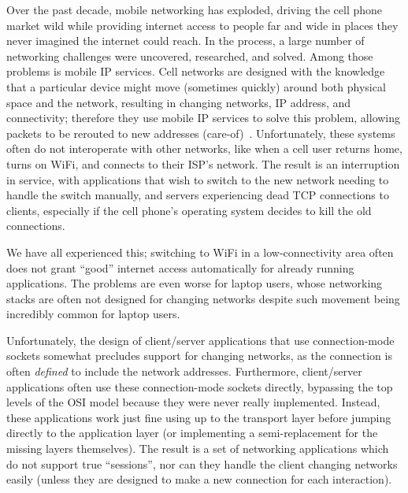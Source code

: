 \documentclass[twocolumn,11pt]{article}
\begin{document}
Over the past decade, mobile networking has exploded, driving the cell phone
market wild while providing internet access to people far and wide in places
they never imagined the internet could reach. In the process, a large number of
networking challenges were uncovered, researched, and solved. Among those
problems is mobile IP services. Cell networks are designed with the knowledge
that a particular device might move (sometimes quickly) around both physical
space and the network, resulting in changing networks, IP address, and
connectivity; therefore they use mobile IP services to solve this problem,
allowing packets to be rerouted to new addresses (care-of)~\cite{Kurose,mobileip}.
Unfortunately, these systems often do not interoperate
with other networks, like when a cell user returns home, turns on WiFi, and
connects to their ISP's network. The result is an
interruption in service, with applications that wish to switch to the new
network needing to handle the switch manually, and servers experiencing dead TCP
connections to clients, especially if the cell phone's operating system decides
to kill the old connections.

We have all experienced this; switching to WiFi in a low-connectivity area often
does not grant ``good'' internet access automatically for already running
applications. The problems are even worse for laptop users, whose networking
stacks are often not designed for changing networks despite such movement being
incredibly common for laptop users.

Unfortunately, the design of client/server applications that use connection-mode
sockets somewhat precludes support for changing networks, as the connection is
often \textit{defined} to include the network addresses. Furthermore,
client/server applications often use these connection-mode sockets directly,
bypassing the top levels of the OSI model because they were never really
implemented. Instead, these applications work just fine using up to the
transport layer before jumping directly to the application layer (or
implementing a semi-replacement for the missing layers themselves). The result
is a set of networking applications which do not support true ``sessions'', nor
can they handle the client changing networks easily (unless they are designed to
make a new connection for each interaction).
\end{document}
